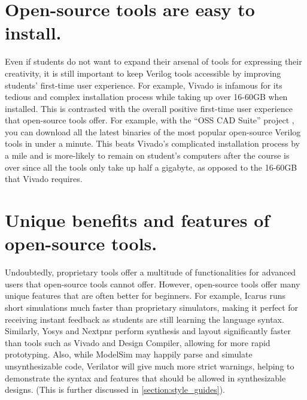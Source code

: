\section{Open-source tools are easy to install.}

Even if students do not want to expand their arsenal of tools for expressing their creativity, it is still important to keep Verilog tools accessible by improving students' first-time user experience. For example, Vivado is infamous for its tedious and complex installation process while taking up over 16-60GB when installed. This is contrasted with the overall positive first-time user experience that open-source tools offer. For example, with the \enquote{OSS CAD Suite} project \cite{osscadsuitebuildGitHub}, you can download all the latest binaries of the most popular open-source Verilog tools in under a minute. This beats Vivado's complicated installation process by a mile and is more-likely to remain on student's computers after the course is over since all the tools only take up half a gigabyte, as opposed to the 16-60GB that Vivado requires.

\section{Unique benefits and features of open-source tools.}

Undoubtedly, proprietary tools offer a multitude of functionalities for advanced users that open-source tools cannot offer. However, open-source tools offer many unique features that are often better for beginners. For example, Icarus runs short simulations much faster than proprietary simulators, making it perfect for receiving instant feedback as students are still learning the language syntax. Similarly, Yosys and Nextpnr perform synthesis and layout significantly faster than tools such as Vivado and Design Compiler, allowing for more rapid prototyping. Also, while ModelSim may happily parse and simulate unsynthesizable code, Verilator will give much more strict warnings, helping to demonstrate the syntax and features that should be allowed in synthesizable designs. (This is further discussed in \autoref{section:style_guides}).

